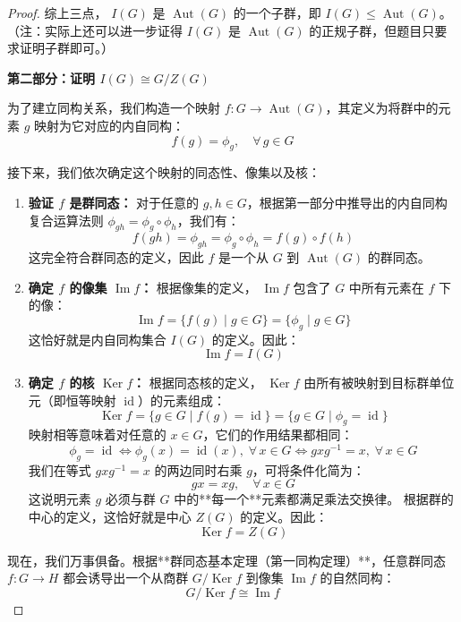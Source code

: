 \documentclass[]{article}
\begin{document}
\begin{proof}
综上三点， $I(G)$ 是 $\operatorname{Aut}(G)$ 的一个子群，即 $I(G) \leqslant \operatorname{Aut}(G)$。
（注：实际上还可以进一步证得 $I(G)$ 是 $\operatorname{Aut}(G)$ 的正规子群，但题目只要求证明子群即可。）

\bigskip
\noindent \textbf{第二部分：证明 $I(G) \cong G / Z(G)$}

为了建立同构关系，我们构造一个映射 $f: G \longrightarrow \operatorname{Aut}(G)$，其定义为将群中的元素 $g$ 映射为它对应的内自同构：
\[ f(g) = \phi_g, \quad \forall \, g \in G \]

接下来，我们依次确定这个映射的同态性、像集以及核：

\begin{enumerate}
	\item \textbf{验证 $f$ 是群同态：}
	对于任意的 $g, h \in G$，根据第一部分中推导出的内自同构复合运算法则 $\phi_{gh} = \phi_g \circ \phi_h$，我们有：
	\[ f(gh) = \phi_{gh} = \phi_g \circ \phi_h = f(g) \circ f(h) \]
	这完全符合群同态的定义，因此 $f$ 是一个从 $G$ 到 $\operatorname{Aut}(G)$ 的群同态。
	
	\item \textbf{确定 $f$ 的像集 $\operatorname{Im} f$：}
	根据像集的定义， $\operatorname{Im} f$ 包含了 $G$ 中所有元素在 $f$ 下的像：
	\[ \operatorname{Im} f = \{ f(g) \mid g \in G \} = \{ \phi_g \mid g \in G \} \]
	这恰好就是内自同构集合 $I(G)$ 的定义。因此：
	\[ \operatorname{Im} f = I(G) \]
	
	\item \textbf{确定 $f$ 的核 $\operatorname{Ker} f$：}
	根据同态核的定义， $\operatorname{Ker} f$ 由所有被映射到目标群单位元（即恒等映射 $\operatorname{id}$）的元素组成：
	\[ \operatorname{Ker} f = \{ g \in G \mid f(g) = \operatorname{id} \} = \{ g \in G \mid \phi_g = \operatorname{id} \} \]
	映射相等意味着对任意的 $x \in G$，它们的作用结果都相同：
	\[ \phi_g = \operatorname{id} \iff \phi_g(x) = \operatorname{id}(x), \;\forall\,x \in G \iff g x g^{-1} = x, \;\forall\,x \in G \]
	我们在等式 $g x g^{-1} = x$ 的两边同时右乘 $g$，可将条件化简为：
	\[ g x = x g, \quad \forall \, x \in G \]
	这说明元素 $g$ 必须与群 $G$ 中的**每一个**元素都满足乘法交换律。
	根据群的中心的定义，这恰好就是中心 $Z(G)$ 的定义。因此：
	\[ \operatorname{Ker} f = Z(G) \]
\end{enumerate}

现在，我们万事俱备。根据**群同态基本定理（第一同构定理）**，任意群同态 $f: G \to H$ 都会诱导出一个从商群 $G/\operatorname{Ker} f$ 到像集 $\operatorname{Im} f$ 的自然同构：
\[ G / \operatorname{Ker} f \cong \operatorname{Im} f \]


\end{proof}
\end{document}
